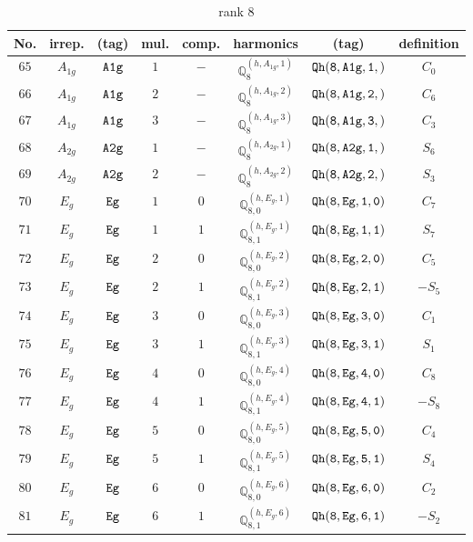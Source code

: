 \documentclass[fleqn,8pt]{jsarticle}
\begin{document}
\begin{table}[ht!]
\begin{center}
\caption{rank 8}
\renewcommand{\arraystretch}{1.3}
\begin{tabular}{cccccccc} \hline \hline
No. & irrep. & (tag) & mul. & comp. & harmonics & (tag) & definition \\ \hline
$ 65 $ & $ A_{1g} $ & $ {\tt A1g} $ & $ 1 $ & $ - $ & $ \mathbb{Q}_{8}^{(h,A_{1g},1)} $ & $ {\tt Qh(8,A1g,1,)} $ & $ C_{0} $ \\
$ 66 $ & $ A_{1g} $ & $ {\tt A1g} $ & $ 2 $ & $ - $ & $ \mathbb{Q}_{8}^{(h,A_{1g},2)} $ & $ {\tt Qh(8,A1g,2,)} $ & $ C_{6} $ \\
$ 67 $ & $ A_{1g} $ & $ {\tt A1g} $ & $ 3 $ & $ - $ & $ \mathbb{Q}_{8}^{(h,A_{1g},3)} $ & $ {\tt Qh(8,A1g,3,)} $ & $ C_{3} $ \\
$ 68 $ & $ A_{2g} $ & $ {\tt A2g} $ & $ 1 $ & $ - $ & $ \mathbb{Q}_{8}^{(h,A_{2g},1)} $ & $ {\tt Qh(8,A2g,1,)} $ & $ S_{6} $ \\
$ 69 $ & $ A_{2g} $ & $ {\tt A2g} $ & $ 2 $ & $ - $ & $ \mathbb{Q}_{8}^{(h,A_{2g},2)} $ & $ {\tt Qh(8,A2g,2,)} $ & $ S_{3} $ \\
$ 70 $ & $ E_{g} $ & $ {\tt Eg} $ & $ 1 $ & $ 0 $ & $ \mathbb{Q}_{8,0}^{(h,E_{g},1)} $ & $ {\tt Qh(8,Eg,1,0)} $ & $ C_{7} $ \\
$ 71 $ & $ E_{g} $ & $ {\tt Eg} $ & $ 1 $ & $ 1 $ & $ \mathbb{Q}_{8,1}^{(h,E_{g},1)} $ & $ {\tt Qh(8,Eg,1,1)} $ & $ S_{7} $ \\
$ 72 $ & $ E_{g} $ & $ {\tt Eg} $ & $ 2 $ & $ 0 $ & $ \mathbb{Q}_{8,0}^{(h,E_{g},2)} $ & $ {\tt Qh(8,Eg,2,0)} $ & $ C_{5} $ \\
$ 73 $ & $ E_{g} $ & $ {\tt Eg} $ & $ 2 $ & $ 1 $ & $ \mathbb{Q}_{8,1}^{(h,E_{g},2)} $ & $ {\tt Qh(8,Eg,2,1)} $ & $ - S_{5} $ \\
$ 74 $ & $ E_{g} $ & $ {\tt Eg} $ & $ 3 $ & $ 0 $ & $ \mathbb{Q}_{8,0}^{(h,E_{g},3)} $ & $ {\tt Qh(8,Eg,3,0)} $ & $ C_{1} $ \\
$ 75 $ & $ E_{g} $ & $ {\tt Eg} $ & $ 3 $ & $ 1 $ & $ \mathbb{Q}_{8,1}^{(h,E_{g},3)} $ & $ {\tt Qh(8,Eg,3,1)} $ & $ S_{1} $ \\
$ 76 $ & $ E_{g} $ & $ {\tt Eg} $ & $ 4 $ & $ 0 $ & $ \mathbb{Q}_{8,0}^{(h,E_{g},4)} $ & $ {\tt Qh(8,Eg,4,0)} $ & $ C_{8} $ \\
$ 77 $ & $ E_{g} $ & $ {\tt Eg} $ & $ 4 $ & $ 1 $ & $ \mathbb{Q}_{8,1}^{(h,E_{g},4)} $ & $ {\tt Qh(8,Eg,4,1)} $ & $ - S_{8} $ \\
$ 78 $ & $ E_{g} $ & $ {\tt Eg} $ & $ 5 $ & $ 0 $ & $ \mathbb{Q}_{8,0}^{(h,E_{g},5)} $ & $ {\tt Qh(8,Eg,5,0)} $ & $ C_{4} $ \\
$ 79 $ & $ E_{g} $ & $ {\tt Eg} $ & $ 5 $ & $ 1 $ & $ \mathbb{Q}_{8,1}^{(h,E_{g},5)} $ & $ {\tt Qh(8,Eg,5,1)} $ & $ S_{4} $ \\
$ 80 $ & $ E_{g} $ & $ {\tt Eg} $ & $ 6 $ & $ 0 $ & $ \mathbb{Q}_{8,0}^{(h,E_{g},6)} $ & $ {\tt Qh(8,Eg,6,0)} $ & $ C_{2} $ \\
$ 81 $ & $ E_{g} $ & $ {\tt Eg} $ & $ 6 $ & $ 1 $ & $ \mathbb{Q}_{8,1}^{(h,E_{g},6)} $ & $ {\tt Qh(8,Eg,6,1)} $ & $ - S_{2} $ \\
 \hline \hline
\end{tabular}
\end{center}
\end{table}
\end{document}

